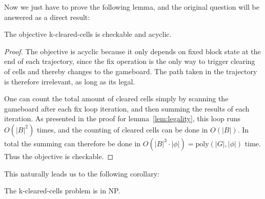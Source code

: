 Now we just have to prove the following lemma, and the original question will be answered as a direct result:\\

\begin{lem}
The objective k-cleared-cells is checkable and acyclic.
\end{lem}

\begin{proof}
The objective is acyclic because it only depends on fixed block state at the end of each trajectory, since the fix operation is the only way to trigger clearing of cells and thereby changes to the gameboard. The path taken in the trajectory is therefore irrelevant, as long as its legal. 

One can count the total amount of cleared cells simply by scanning the gameboard after each fix loop iteration, and then summing the results of each iteration. As presented in the proof for lemma~\ref{lem:legality}, this loop runs $O(|B|^2)$ times, and the counting of cleared cells can be done in $O(|B|)$. In total the summing can therefore be done in $O(|B|^3 \cdot |\phi|) = \text{poly}(|G|, |\phi|)$ time. Thus the objective is checkable.
\end{proof}

This naturally leads us to the following corollary:\\

\begin{cor}
The k-cleared-cells problem is in NP.
\end{cor}
